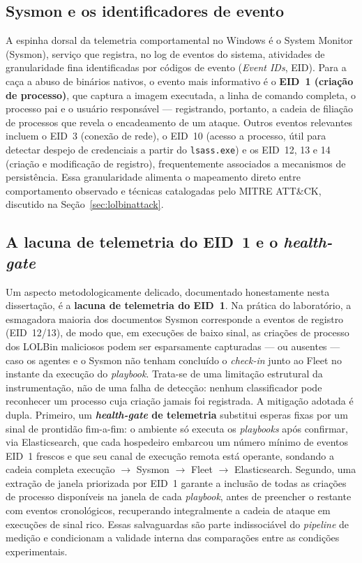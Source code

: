 \subsection{Sysmon e os identificadores de evento}
\label{subsec:sysmon}

A espinha dorsal da telemetria comportamental no Windows é o System Monitor (Sysmon), serviço que registra, no log de eventos do sistema, atividades de granularidade fina identificadas por códigos de evento (\textit{Event IDs}, EID). Para a caça a abuso de binários nativos, o evento mais informativo é o \textbf{EID~1 (criação de processo)}, que captura a imagem executada, a linha de comando completa, o processo pai e o usuário responsável — registrando, portanto, a cadeia de filiação de processos que revela o encadeamento de um ataque. Outros eventos relevantes incluem o EID~3 (conexão de rede), o EID~10 (acesso a processo, útil para detectar despejo de credenciais a partir do \texttt{lsass.exe}) e os EID~12, 13 e 14 (criação e modificação de registro), frequentemente associados a mecanismos de persistência. Essa granularidade alimenta o mapeamento direto entre comportamento observado e técnicas catalogadas pelo MITRE ATT\&CK, discutido na Seção~\ref{sec:lolbinattack}.

\subsection{A lacuna de telemetria do EID~1 e o \textit{health-gate}}
\label{subsec:eid1gap}

Um aspecto metodologicamente delicado, documentado honestamente nesta dissertação, é a \textbf{lacuna de telemetria do EID~1}. Na prática do laboratório, a esmagadora maioria dos documentos Sysmon corresponde a eventos de registro (EID~12/13), de modo que, em execuções de baixo sinal, as criações de processo dos LOLBin maliciosos podem ser esparsamente capturadas — ou ausentes — caso os agentes e o Sysmon não tenham concluído o \textit{check-in} junto ao Fleet no instante da execução do \textit{playbook}. Trata-se de uma limitação estrutural da instrumentação, não de uma falha de detecção: nenhum classificador pode reconhecer um processo cuja criação jamais foi registrada. A mitigação adotada é dupla. Primeiro, um \textbf{\textit{health-gate} de telemetria} substitui esperas fixas por um sinal de prontidão fim-a-fim: o ambiente só executa os \textit{playbooks} após confirmar, via Elasticsearch, que cada hospedeiro embarcou um número mínimo de eventos EID~1 frescos e que seu canal de execução remota está operante, sondando a cadeia completa \mbox{execução} $\rightarrow$ Sysmon $\rightarrow$ Fleet $\rightarrow$ Elasticsearch. Segundo, uma extração de janela priorizada por EID~1 garante a inclusão de todas as criações de processo disponíveis na janela de cada \textit{playbook}, antes de preencher o restante com eventos cronológicos, recuperando integralmente a cadeia de ataque em execuções de sinal rico. Essas salvaguardas são parte indissociável do \textit{pipeline} de medição e condicionam a validade interna das comparações entre as condições experimentais.

